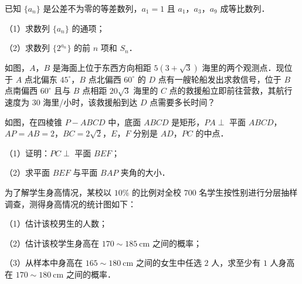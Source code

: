 \endgroup
{}
\begin{question}
已知 $\{a_n\}$ 是公差不为零的等差数列，$a_1=1$ 且 $a_1$，$a_3$，$a_9$ 成等比数列．

（1）求数列 $\{a_n\}$ 的通项；

（2）求数列 $\{2^{a_n}\}$ 的前 $n$ 项和 $S_n$．

\Needspace{0.4\textheight}
\end{question}
\begingroup
\renewenvironment{question}{\Needspace{0.5\textheight}}{}
\begin{question}
如图，$A$，$B$ 是海面上位于东西方向相距 $5(3+\sqrt3)$ 海里的两个观测点．现位于 $A$ 点北偏东 $45^\circ$，$B$ 点北偏西 $60^\circ$ 的 $D$ 点有一艘轮船发出求救信号，位于 $B$ 点南偏西 $60^\circ$ 且与 $B$ 点相距 $20\sqrt3$ 海里的 $C$ 点的救援船立即前往营救，其航行速度为 $30$ 海里/小时，该救援船到达 $D$ 点需要多长时间？
\nopagebreak[4]
\begin{center}\end{center}
\nopagebreak[4]
\Needspace{0.4\textheight}
\end{question}
\endgroup
\begingroup
\renewenvironment{question}{\Needspace{0.5\textheight}}{}
\begin{question}
如图，在四棱锥 $P-ABCD$ 中，底面 $ABCD$ 是矩形，$PA\perp$ 平面 $ABCD$，$AP=AB=2$，$BC=2\sqrt2$，$E$，$F$ 分别是 $AD$，$PC$ 的中点．

（1）证明：$PC\perp$ 平面 $BEF$；

（2）求平面 $BEF$ 与平面 $BAP$ 夹角的大小．
\nopagebreak[4]
\begin{center}\end{center}
\nopagebreak[4]
\Needspace{0.4\textheight}
\end{question}
\endgroup
\begingroup
\renewenvironment{question}{\Needspace{0.5\textheight}}{}
\begin{question}
为了解学生身高情况，某校以 $10\%$ 的比例对全校 $700$ 名学生按性别进行分层抽样调查，测得身高情况的统计图如下：

（1）估计该校男生的人数；

（2）估计该校学生身高在 $170\sim 185\ \mathrm{cm}$ 之间的概率；

（3）从样本中身高在 $165\sim 180\ \mathrm{cm}$ 之间的女生中任选 $2$ 人，求至少有 $1$ 人身高在 $170\sim 180\ \mathrm{cm}$ 之间的概率．
\nopagebreak[4]
\begin{center}\end{center}
\nopagebreak[4]
\Needspace{0.4\textheight}
\end{question}
